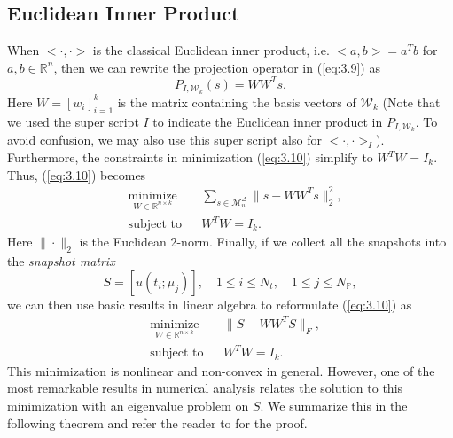 \subsection{Euclidean Inner Product}When $<\cdot,\cdot>$ is the classical Euclidean inner product, i.e. $<a,b> = a^Tb$ for $a,b\in \mathbb R^{n}$, then we can rewrite the projection operator in (\ref{eq:3.9}) as
\begin{equation}
	P_{I,\mathcal W_k} (s) = WW^T s.
\end{equation}
Here $W = [w_i]_{i=1}^k$ is the matrix containing the basis vectors of $\mathcal W_k$ (Note that we used the super script $I$ to indicate the Euclidean inner product in $P_{I,\mathcal W_k}$. To avoid confusion, we may also use this super script also for $<\cdot,\cdot>_I$). Furthermore, the constraints in minimization (\ref{eq:3.10}) simplify to $W^TW = I_k$. Thus, (\ref{eq:3.10}) becomes
\begin{equation} \label{eq:3.11}
\begin{aligned}
&  \underset{W\in\mathbb R^{n\times k}}{\text{minimize}}
& & \sum_{s\in \mathcal M_u^{\Delta}} \| s - WW^Ts\|^2_2, \\
& \text{subject to}
& & W^TW=I_k.
\end{aligned}
\end{equation}
Here $\|\cdot \|_2$ is the Euclidean 2-norm. Finally, if we collect all the snapshots into the \emph{snapshot matrix}
\begin{equation} \label{eq:3.12}
	S = [u(t_i;\mu_j)],\quad 1\leq i \leq N_t,\quad 1 \leq j \leq N_{\mathbb P},
\end{equation}
we can then use basic results in linear algebra \cite{trefethen97} to reformulate (\ref{eq:3.10}) as
\begin{equation} \label{eq:3.13}
\begin{aligned}
&  \underset{W\in\mathbb R^{n\times k}}{\text{minimize}}
& & \| S - WW^TS \|_F, \\
& \text{subject to}
& & W^TW=I_k.
\end{aligned}
\end{equation}
This minimization is nonlinear and non-convex in general. However, one of the most remarkable results in numerical analysis relates the solution to this minimization with an eigenvalue problem on $S$. We summarize this in the following theorem and refer the reader to \cite{Markovsky:2011:LRA:2103589} for the proof.
